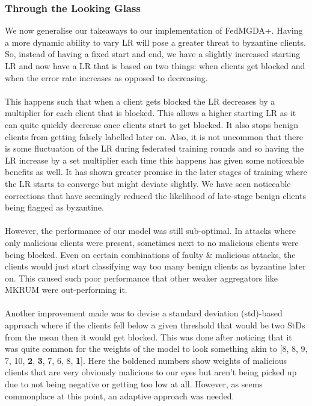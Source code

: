 \subsubsection{Through the Looking Glass}
We now generalise our takeaways to our implementation of FedMGDA+. 
Having a more dynamic ability to vary LR will pose a greater threat to byzantine clients.
So, instead of having a fixed start and end, we have a slightly increased starting LR and now have a LR that is based on two things: when clients get blocked and when the error rate increases as opposed to decreasing.
\\ \\
This happens such that when a client gets blocked the LR decreases by a multiplier for each client that is blocked.
This allows a higher starting LR as it can quite quickly decrease once clients start to get blocked.
It also stops benign clients from getting falsely labelled later on.
Also, it is not uncommon that there is some fluctuation of the LR during federated training rounds and so having the LR increase by a set multiplier each time this happens has given some noticeable benefits as well.
It has shown greater promise in the later stages of training where the LR starts to converge but might deviate slightly.
We have seen noticeable corrections that have seemingly reduced the likelihood of late-stage benign clients being flagged as byzantine.
\\ \\
However, the performance of our model was still sub-optimal.
In attacks where only malicious clients were present, sometimes next to no malicious clients were being blocked.
Even on certain combinations of faulty \& malicious attacks, the clients would just start classifying way too many benign clients as byzantine later on.
This caused such poor performance that other weaker aggregators like MKRUM were out-performing it.
\\ \\
Another improvement made was to devise a standard deviation (std)-based approach where if the clients fell below a given threshold that would be two StDs from the mean then it would get blocked.
This was done after noticing that it was quite common for the weights of the model to look something akin to [8, 8, 9, 7, 10, \textbf{2}, \textbf{3}, 7, 6, 8, \textbf{1}].
Here the boldened numbers show weights of malicious clients that are very obviously malicious to our eyes but aren't being picked up due to not being negative or getting too low at all.
However, as seems commonplace at this point, an adaptive approach was needed.
